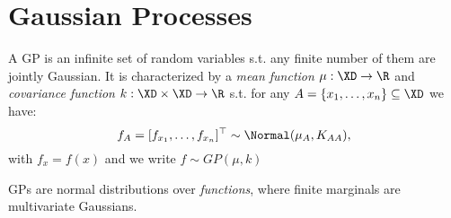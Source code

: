 \section{Gaussian Processes}
\begin{definition*}
    A GP is an infinite set of random variables s.t. any finite number of them are jointly Gaussian.
    It is characterized by a \textit{mean function} \(\mu: \XD \to \R\) and \textit{covariance function} \(k: \XD \times \XD \to \R\) s.t. for any \(A = \{x_1, \ldots, x_n\} \subseteq \XD\) we have:
    \[f_A = [f_{x_1}, \ldots, f_{x_n}]^\top \sim \Normal(\mu_A, K_{AA}),\]
    with \(f_x = f(x)\) and we write \(f \sim GP(\mu, k)\)
\end{definition*}
GPs are normal distributions over \textit{functions}, where finite marginals are multivariate Gaussians.